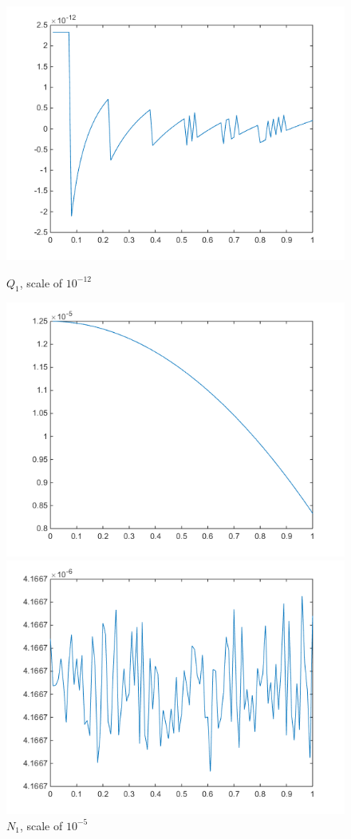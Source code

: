 \documentclass[11pt,letterpaper]{article}
\begin{document}
\begin{figure}[!htb]
  \includegraphics[width=\linewidth]{figures/gradDifQ.png}
  \caption{$Q_1$, scale of $10^{-12}$}\label{fig:gradDifQ}
\endminipage\hfill
{}
  \includegraphics[width=\linewidth]{figures/gradDifN.png}
  \caption{$N_1$, scale of $10^{-5}$}\label{fig:gradDifN}
\endminipage\hfill
{}
  \includegraphics[width=\linewidth]{figures/gradDifS.png}

\end{figure}
\end{document}
